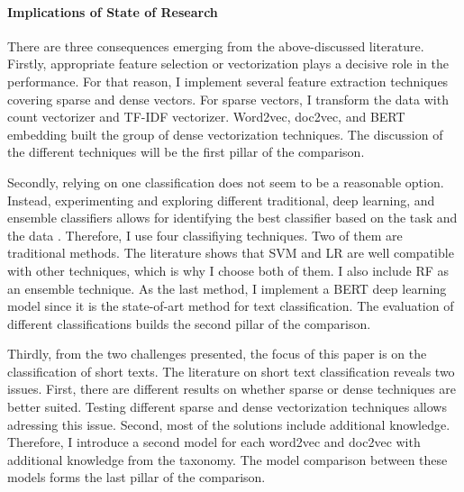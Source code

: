 \documentclass[12pt, a4paper, titlepage]{article}
\begin{document}
\paragraph{Implications of State of Research}
There are three consequences emerging from the above-discussed literature. Firstly, appropriate feature selection or vectorization plays a decisive role in the performance. For that reason, I implement several feature extraction techniques covering sparse and dense vectors. For sparse vectors, I transform the data with count vectorizer and \ac{TF-IDF} vectorizer. Word2vec, doc2vec, and \ac{BERT} embedding built the group of dense vectorization techniques. The discussion of the different techniques will be the first pillar of the comparison. 

Secondly, relying on one classification does not seem to be a reasonable option. Instead, experimenting and exploring different traditional, deep learning, and ensemble classifiers allows for identifying the best classifier based on the task and the data \citep{maglogiannis2007}. Therefore, I use four classifiying techniques. Two of them are traditional methods. The literature shows that \ac{SVM} and \ac{LR} are well compatible with other techniques, which is why I choose both of them. I also include \ac{RF} as an ensemble technique. As the last method, I implement a \ac{BERT} deep learning model since it is the state-of-art method for text classification. The evaluation of different classifications builds the second pillar of the comparison. 

Thirdly, from the two challenges presented, the focus of this paper is on the classification of short texts. The literature on short text classification reveals two issues. First, there are different results on whether sparse or dense techniques are better suited. Testing different sparse and dense vectorization techniques allows adressing this issue. Second, most of the solutions include additional knowledge. Therefore, I introduce a second model for each word2vec and doc2vec with additional knowledge from the taxonomy. The model comparison between these models forms the last pillar of the comparison. 
\end{document}
